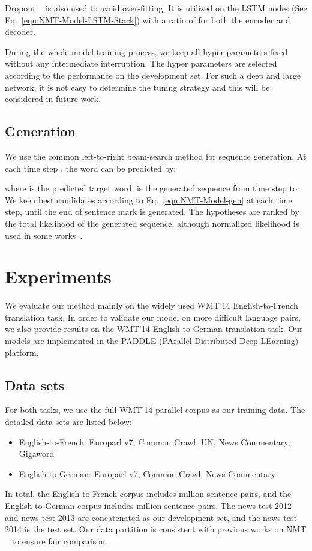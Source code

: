 \documentclass[11pt,letterpaper]{article}
\begin{document}
Dropout ~\cite{Hinton-Salakhutdinov-Arxiv2012} is also used to avoid over-fitting. It is utilized on the LSTM nodes  (See
Eq.~\ref{eqn:NMT-Model-LSTM-Stack}) with a ratio of  for both the encoder and decoder.

During the whole model training process, we keep all hyper parameters fixed without any intermediate interruption. The hyper parameters are
selected according to the performance on the development set. For such a deep and large network, it is not easy to determine the tuning
strategy and this will be considered in future work.

\subsection{Generation}

We use the common left-to-right beam-search method for sequence generation. At each time step , the word  can be predicted by:

where  is the predicted target word.  is the generated sequence from time step  to . We keep
 best candidates according to Eq.~\ref{eqn:NMT-Model-gen} at each time step, until the end of sentence mark is generated. The hypotheses
are ranked by the total likelihood of the generated sequence, although normalized likelihood is used in some
works~\cite{Jean-Bengio-ACL2015}.


\section{Experiments}

We evaluate our method mainly on the widely used WMT'14 English-to-French translation task. In order to validate our model on more difficult
language pairs, we also provide results on the WMT'14 English-to-German translation task. Our models are implemented in the PADDLE (PArallel
Distributed Deep LEarning) platform.

\subsection{Data sets}


For both tasks, we use the full WMT'14  parallel corpus as our training data. The detailed data sets are listed below:
\begin{itemize}
\item English-to-French: Europarl v7, Common Crawl, UN, News Commentary, Gigaword
\item English-to-German: Europarl v7, Common Crawl, News Commentary
\end{itemize}
In total, the English-to-French corpus includes  million sentence pairs, and the English-to-German corpus includes  million sentence
pairs.
The news-test-2012 and news-test-2013 are concatenated as our development set, and the news-test-2014 is the test set. Our data partition is
consistent with previous works on NMT ~\cite{Luong-Zaremba-ACL2015,Jean-Bengio-ACL2015}  to ensure fair comparison.
\end{document}
